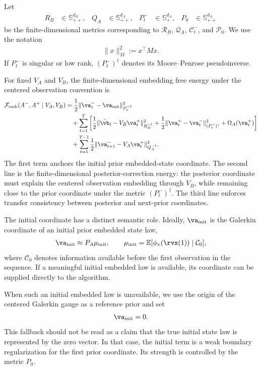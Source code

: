 \documentclass[twoside,11pt]{article}
\begin{document}
Let
\begin{align}
R_B
&\in\mathbb S_{++}^{d_B},
&
Q_A
&\in\mathbb S_{++}^{d_A},
&
P_t^-
&\in\mathbb S_{+}^{d_A},
&
P_0
&\in\mathbb S_{++}^{d_A}
\label{eq:finite_metric_matrices}
\end{align}
be the finite-dimensional metrics corresponding to
$\mathcal R_B$, $\mathcal Q_A$, $\mathcal C_t^-$, and
$\mathcal P_0$. We use the notation
\begin{align}
\|x\|_{M}^{2}
:=
x^\top M x.
\label{eq:finite_weighted_norm}
\end{align}
If $P_t^-$ is singular or low rank, $(P_t^-)^\dagger$ denotes its
Moore--Penrose pseudoinverse.

For fixed $V_A$ and $V_B$, the finite-dimensional embedding free energy
under the centered observation convention is
\begin{align}
\mathcal F_{\mathrm{emb}}
(A^-,A^+\mid V_A,V_B)
&=
\frac12
\|\va_1^- - \va_{\mathrm{init}}\|_{P_0^{-1}}^2
\nonumber\\
&\quad+
\sum_{t=1}^{T}
\left[
\frac12
\|\tilde{\vb}_t - V_B\va_t^+\|_{R_B^{-1}}^2
+
\frac12
\|\va_t^+ - \va_t^-\|_{(P_t^-)^\dagger}^2
+
\Omega_A(\va_t^+)
\right]
\nonumber\\
&\quad+
\sum_{t=1}^{T-1}
\frac12
\|\va_{t+1}^- - V_A\va_t^+\|_{Q_A^{-1}}^2 .
\label{eq:finite_embedding_free_energy}
\end{align}
The first term anchors the initial prior embedded-state coordinate. The
second line is the finite-dimensional posterior-correction energy: the
posterior coordinate must explain the centered observation embedding
through $V_B$, while remaining close to the prior coordinate under the
metric $(P_t^-)^\dagger$. The third line enforces transfer consistency
between posterior and next-prior coordinates.

The initial coordinate has a distinct semantic role. Ideally,
$\va_{\mathrm{init}}$ is the Galerkin coordinate of an initial prior
embedded state law,
\begin{align}
\va_{\mathrm{init}}
\approx
P_A\mu_{\mathrm{init}},
\qquad
\mu_{\mathrm{init}}
=
\mathbb E[\phi_x(\rvx(1))\mid \mathcal C_0],
\label{eq:initial_prior_embedding_coordinate}
\end{align}
where $\mathcal C_0$ denotes information available before the first
observation in the sequence. If a meaningful initial embedded law is
available, its coordinate can be supplied directly to the algorithm.

When such an initial embedded law is unavailable, we use the origin of
the centered Galerkin gauge as a reference prior and set
\begin{align}
\va_{\mathrm{init}}=0.
\label{eq:zero_reference_initial_coordinate}
\end{align}
This fallback should not be read as a claim that the true initial state
law is represented by the zero vector. In that case, the initial term is
a weak boundary regularization for the first prior coordinate. Its
strength is controlled by the metric $P_0$.
\end{document}
